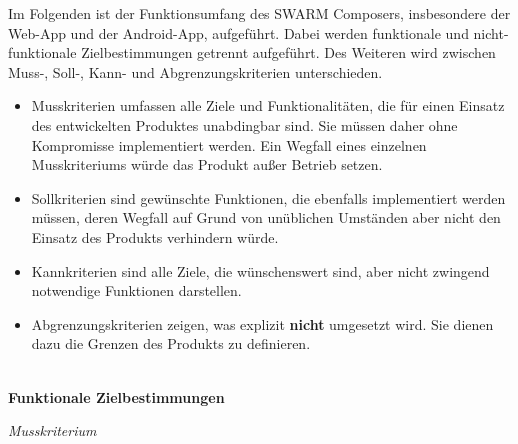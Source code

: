 Im Folgenden ist der Funktionsumfang des SWARM Composers, insbesondere der Web-App und der Android-App, aufgeführt. Dabei werden funktionale und nicht-funktionale Zielbestimmungen getrennt aufgeführt. Des Weiteren wird zwischen Muss-, Soll-, Kann- und Abgrenzungskriterien unterschieden.
%
\begin{itemize}[leftmargin=4pc]
	\item Musskriterien umfassen alle Ziele und Funktionalitäten, die für einen Einsatz des entwickelten Produktes unabdingbar sind.
	Sie müssen daher ohne Kompromisse implementiert werden. Ein Wegfall eines einzelnen Musskriteriums würde das Produkt außer Betrieb setzen.
	\item Sollkriterien sind gewünschte Funktionen, die ebenfalls implementiert werden müssen, deren Wegfall auf Grund von unüblichen Umständen aber nicht den Einsatz des Produkts verhindern würde.
	\item Kannkriterien sind alle Ziele, die wünschenswert sind, aber nicht zwingend notwendige Funktionen darstellen. 
	\item Abgrenzungskriterien zeigen, was explizit \textbf{nicht} umgesetzt wird. Sie dienen dazu die Grenzen des Produkts zu definieren.
	\\\\
\end{itemize}
%

\textbf{Funktionale Zielbestimmungen}\newline
%

\textit{Musskriterium}

